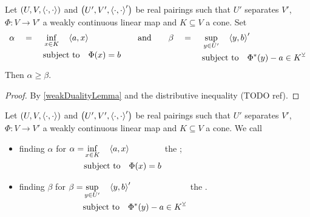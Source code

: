 \begin{proposition}
Let $\sSet{U,V,\pair{\cdot,\cdot}}$ and $\sSet{U',V',\pair{\cdot,\cdot}'}$ be real pairings such that $U'$ separates $V'$, $\Phi: V\to V'$ a weakly continuous linear map and $K\subseteq V$ a cone.
Set
\[ \alpha \quad=\quad \begin{aligned}[t]
&\inf_{x\in K} \quad  \left\langle a,x \right\rangle \\
&\text{subject to} \quad  \Phi(x) = b
\end{aligned}\qquad \text{and}\qquad \beta \quad=\quad \begin{aligned}[t]
&\sup_{y\in U'} \quad  \left\langle y,b \right\rangle' \\
&\text{subject to} \quad  \Phi^*(y) - a \in K^\veebar
\end{aligned} \]
Then $\alpha \geq \beta$.
\end{proposition}
\begin{proof}
By \ref{weakDualityLemma} and the distributive inequality (TODO ref).
\end{proof}

\begin{definition}
Let $\sSet{U,V,\pair{\cdot,\cdot}}$ and $\sSet{U',V',\pair{\cdot,\cdot}'}$ be real pairings such that $U'$ separates $V'$, $\Phi: V\to V'$ a weakly continuous linear map and $K\subseteq V$ a cone. We call
\begin{itemize}
\item finding $\alpha$ for $\begin{aligned}[t]
\alpha = &\inf_{x\in K} \quad  \left\langle a,x \right\rangle \\
&\text{subject to} \quad  \Phi(x) = b
\end{aligned}$ the ;
\item finding $\beta$ for $\begin{aligned}[t]
\beta = &\sup_{y\in U'} \quad  \left\langle y,b \right\rangle' \\
&\text{subject to} \quad  \Phi^*(y) - a \in K^\veebar
\end{aligned}$ the .
\end{itemize}
\end{definition}

